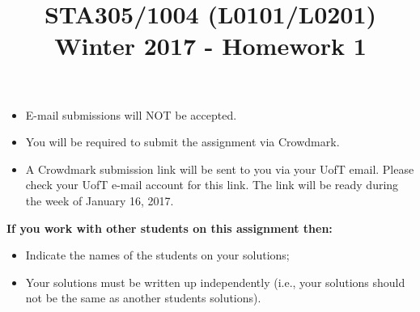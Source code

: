 \documentclass[11pt, oneside]{article}   	%
\title{STA305/1004 (L0101/L0201) Winter 2017 -  Homework 1}
\author{}
\date{}							%
\begin{document}
\maketitle


{
\begin{itemize}
\item E-mail submissions will NOT be accepted.
\item You will be required to submit the assignment via Crowdmark.
\item A Crowdmark submission link will be sent to you via your UofT email.  Please check your UofT e-mail account for this link.   The link will be ready during the week of January 16, 2017.
\end{itemize}
} 


{\noindent \bf If you work with other students on this assignment then:}  
\begin{itemize}
\item Indicate the names of the students on your solutions;  
\item Your solutions must be written up independently (i.e., your solutions should not be the same as another students solutions).
\end{itemize}


\newpage
\end{document}
